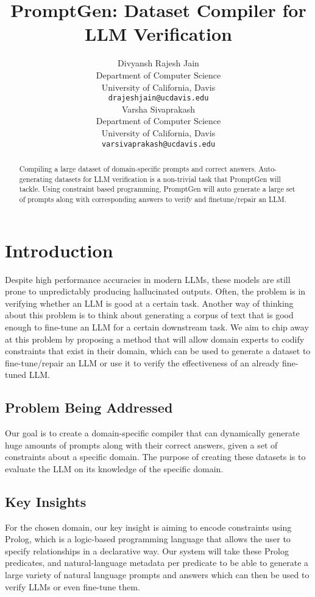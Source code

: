 \documentclass{article}
\title{PromptGen: Dataset Compiler for LLM Verification}
\author{ 
    Divyansh Rajesh Jain \\
    Department of Computer Science \\
    University of California, Davis \\
    \texttt{drajeshjain@ucdavis.edu} \\
    \And
    Varsha Sivaprakash\\
    Department of Computer Science \\
    University of California, Davis \\
    \texttt{varsivaprakash@ucdavis.edu} \\
}
\begin{document}

\maketitle


\begin{abstract}
  Compiling a large dataset of domain-specific prompts and correct answers.  Auto-generating datasets for LLM verification 
  is a non-trivial task that PromptGen will tackle.  Using constraint based programming, PromptGen will auto generate a large 
  set of prompts along with corresponding answers to verify and finetune/repair an LLM.
\end{abstract}


\section{Introduction}


Despite high performance accuracies in modern LLMs, 
these models are still prone to unpredictably producing hallucinated outputs.
 Often, the problem is in verifying whether an LLM is good at a certain task. 
 Another way of thinking about this problem is to think about generating a corpus of 
 text that is good enough to fine-tune an LLM for a certain downstream task. We aim to chip 
 away at this problem by proposing a method that will allow domain experts to codify constraints
  that exist in their domain, which can be used to generate a dataset to fine-tune/repair an LLM or use 
  it to verify the effectiveness of an already fine-tuned LLM.




\subsection{Problem Being Addressed}


Our goal is to create a domain-specific compiler that can dynamically generate huge amounts of prompts along with their correct answers, given a set of constraints about a specific domain.  The purpose of creating these datasets is to evaluate the LLM on its knowledge of the specific domain.

\subsection{Key Insights}


For the chosen domain, our key insight is aiming to encode constraints using Prolog, which is a logic-based programming language that allows the user to specify relationships in a declarative way.  Our system will take these Prolog predicates, and natural-language metadata per predicate to be able to generate a large variety of natural language prompts and answers which can then be used to verify LLMs or even fine-tune them.  
\end{document}

